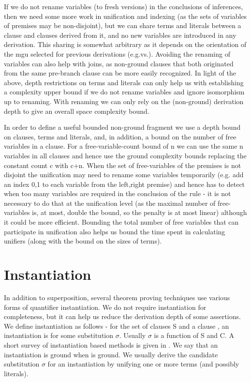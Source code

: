 If we do not rename variables (to fresh versions) in the conclusions of inferences, then we need some more work in unification and indexing (as the sets of variables of premises may be non-disjoint), but we can share terms and literals between a clause and clauses derived from it, and no new variables are introduced in any derivation. This sharing is somewhat arbitrary as it depends on the orientation of the mgu selected for previous derivations (e.g.vs.). 
Avoiding the renaming of variables can also help with joins, as non-ground clauses that both originated from the same pre-branch clause can be more easily recognized.
In light of the above, depth restrictions on terms and literals can only help us with establishing a complexity upper bound if we do not rename variables and ignore isomorphism up to renaming. With renaming we can only rely on the (non-ground) derivation depth to give an overall space complexity bound.

In order to define a useful bounded non-ground fragment we use a depth bound on clauses, terms and literals, and, in addition, a bound on the number of free variables in a clause. For a free-variable-count bound of n we can use the same n variables in all clauses and hence use the ground complexity bounds replacing the constant count c with c+n. 
When the set of free-variables of the premises is not disjoint the unification may need to rename some variables temporarily (e.g. add an index 0,1 to each variable from the left,right premise) and hence has to detect when too many variables are required in the conclusion of the rule - it is not necessary to do that at the unification level (as the maximal number of free-variables is, at most, double the bound, so the penalty is at most linear) although it could be more efficient. Bounding the total number of free variables that can participate in unification also helps us bound the time spent in calculating unifiers (along with the bound on the sizes of terms).

\section{Instantiation}
In addition to superposition, several theorem proving techniques use various forms of quantifier instantiation. We do not require instantiation for completeness, but it can help us reduce the derivation depth of some assertions.\\
We define instantiation as follows - for the set of clauses S and a clause , an instantiation is  for some substitution $\sigma$. Usually $\sigma$ is a function of S and C. A short survey of instantiation based methods is given in \cite{DBLP:journals/corr/abs-1202-6148}.
We say that an instantiation is ground when  is ground.
We usually derive the candidate substitution $\sigma$ for an instantiation by unifying one or more terms (and possibly literals).

